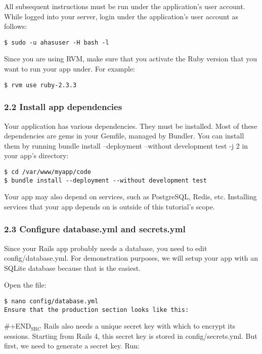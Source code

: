 \documentclass[11pt]{article}
\begin{document}
All subsequent instructions must be run under the application's user account. While logged into your server, login under the application's user account as follows:

\begin{verbatim}
$ sudo -u ahasuser -H bash -l
\end{verbatim}

Since you are using RVM, make sure that you activate the Ruby version that you want to run your app under. For example:

\begin{verbatim}
$ rvm use ruby-2.3.3
\end{verbatim}

\subsubsection{2.2 Install app dependencies}
\label{sec:org2706ca1}

Your application has various dependencies. They must be installed. Most of these dependencies are gems in your Gemfile, managed by Bundler. You can install them by running bundle install --deployment --without development test -j 2 in your app's directory:

\begin{verbatim}
$ cd /var/www/myapp/code
$ bundle install --deployment --without development test
\end{verbatim}

Your app may also depend on services, such as PostgreSQL, Redis, etc. Installing services that your app depends on is outside of this tutorial's scope.

\subsubsection{2.3 Configure database.yml and secrets.yml}
\label{sec:orgc6555b5}

Since your Rails app probably needs a database, you need to edit config/database.yml. For demonstration purposes, we will setup your app with an SQLite database because that is the easiest.

Open the file:
\begin{verbatim}
$ nano config/database.yml
Ensure that the production section looks like this:
\end{verbatim}


\#+END\(_{\text{SRC}}\)
Rails also needs a unique secret key with which to encrypt its sessions. Starting from Rails 4, this secret key is stored in config/secrets.yml. But first, we need to generate a secret key. Run:
\end{document}
